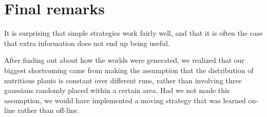 \documentclass{article}
\begin{document}


\section{Final remarks}
It is surprising that simple strategies work fairly well, and that it is often
the case that extra information does not end up being useful. 

After finding out about how the worlds were generated, we realized that our
biggest shortcoming came from making the assumption that the distribution of
nutritious plants is constant over different runs, rather than involving
three gaussians randomly placed within a certain area. Had we not made this
assumption, we would have implemented a moving strategy that was learned on-line
rather than off-line. 
\end{document}
